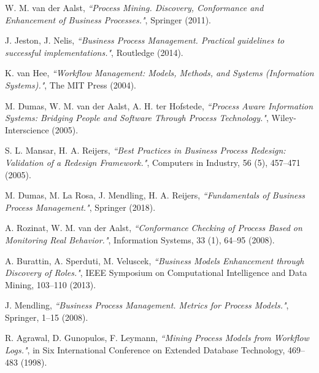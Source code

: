\documentclass[
11pt,%
tightenlines,%
twoside,%
onecolumn,%
nofloats,%
nobibnotes,%
nofootinbib,%
superscriptaddress,%
noshowpacs,%
centertags]%
{revtex4}
\begin{document}
\begin{thebibliography}{99}

W. M. van der Aalst, {\it ``Process Mining. Discovery, Conformance and Enhancement of Business Processes."}, Springer (2011).

J. Jeston, J. Nelis, {\it ``Business Process Management. Practical guidelines to successful implementations."}, Routledge (2014).

K. van Hee, {\it ``Workflow Management: Models, Methods, and Systems (Information Systems)."}, The MIT Press (2004).

M. Dumas, W. M. van der Aalst, A. H. ter Hofstede, {\it ``Process Aware Information Systems: Bridging People and Software Through Process Technology."}, Wiley-Interscience (2005).

S. L. Mansar, H. A. Reijers, {\it ``Best Practices in Business Process Redesign: Validation of a Redesign Framework."}, Computers in Industry, 56 (5), 457--471 (2005).

M. Dumas, M. La Rosa, J. Mendling, H. A. Reijers, {\it ``Fundamentals of Business Process Management."}, Springer (2018).

A. Rozinat, W. M. van der Aalst, {\it ``Conformance Checking of Process Based on Monitoring Real Behavior."}, Information Systems, 33 (1), 64--95 (2008).

A. Burattin, A. Sperduti, M. Veluscek, {\it ``Business Models Enhancement through Discovery of Roles."}, IEEE Symposium on Computational Intelligence and Data Mining, 103--110 (2013).

J. Mendling, {\it ``Business Process Management. Metrics for Process Models."}, Springer, 1--15 (2008).

R. Agrawal, D. Gunopulos, F. Leymann, {\it ``Mining Process Models from Workflow Logs."}, in Six International Conference on Extended Database Technology, 469--483 (1998).

\end{thebibliography}
\end{document}
